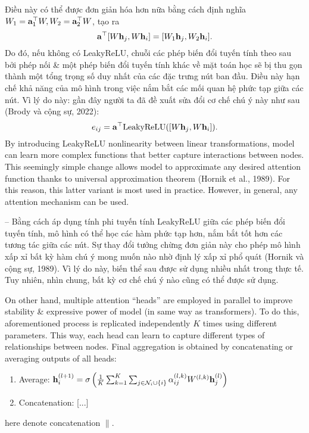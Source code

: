 \documentclass{article}
\begin{document}
\begin{itemize}
\begin{itemize}
\begin{itemize}
\begin{equation*}
            \end{equation*}
            Điều này có thể được đơn giản hóa hơn nữa bằng cách định nghĩa $W_1 = {\bf a}_1^\top W,W_2 = {\bf a}_2^\top W$, tạo ra
            \begin{equation*}
                {\bf a}^\top[W{\bf h}_j,W{\bf h}_i] = [W_1{\bf h}_j,W_2{\bf h}_i].
            \end{equation*}
            Do đó, nếu không có LeakyReLU, chuỗi các phép biến đổi tuyến tính theo sau bởi phép nối \& một phép biến đổi tuyến tính khác về mặt toán học sẽ bị thu gọn thành một tổng trọng số duy nhất của các đặc trưng nút ban đầu. Điều này hạn chế khả năng của mô hình trong việc nắm bắt các mối quan hệ phức tạp giữa các nút. Vì lý do này: gần đây người ta đã đề xuất sửa đổi cơ chế chú ý này như sau (Brody và cộng sự, 2022):
            \begin{equation*}
                e_{ij} = {\bf a}^\top{\rm LeakyReLU}([W{\bf h}_j,W{\bf h}_i]).
            \end{equation*}
            By introducing LeakyReLU nonlinearity between linear transformations, model can learn more complex functions that better capture interactions between nodes. This seemingly simple change allows model to approximate any desired attention function thanks to universal approximation theorem (Hornik et al., 1989). For this reason, this latter variant is most used in practice. However, in general, any attention mechanism can be used.

            -- Bằng cách áp dụng tính phi tuyến tính LeakyReLU giữa các phép biến đổi tuyến tính, mô hình có thể học các hàm phức tạp hơn, nắm bắt tốt hơn các tương tác giữa các nút. Sự thay đổi tưởng chừng đơn giản này cho phép mô hình xấp xỉ bất kỳ hàm chú ý mong muốn nào nhờ định lý xấp xỉ phổ quát (Hornik và cộng sự, 1989). Vì lý do này, biến thể sau được sử dụng nhiều nhất trong thực tế. Tuy nhiên, nhìn chung, bất kỳ cơ chế chú ý nào cũng có thể được sử dụng.

            On other hand, multiple attention ``heads'' are employed in parallel to improve stability \& expressive power of model (in same way as transformers). To do this, aforementioned process is replicated independently $K$ times using different parameters. This way, each head can learn to capture different types of relationships between nodes. Final aggregation is obtained by concatenating or averaging outputs of all heads:
            \begin{enumerate}
                \item Average: ${\bf h}_i^{(l + 1)} = \sigma\left(\frac{1}{K}\sum_{k=1}^K\sum_{j\in{\cal N}_i\cup\{i\}} \alpha_{ij}^{(l,k)}W^{(l,k)}{\bf h}_j^{(l)}\right)$
                \item Concatenation: [...]
            \end{enumerate}
            here denote concatenation $\parallel$.


\end{itemize}
\end{itemize}
\end{itemize}
\end{document}

